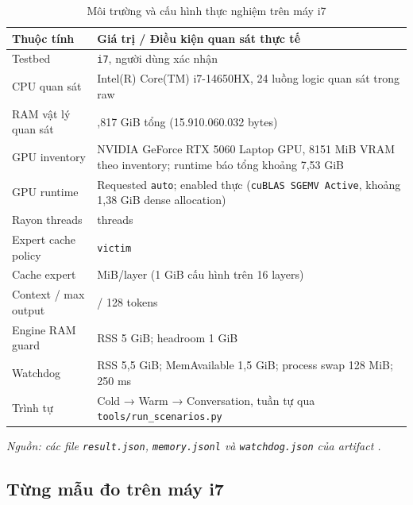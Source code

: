 \begin{table}[htbp]
\centering
\caption{Môi trường và cấu hình thực nghiệm trên máy i7}
\small
\setlength{\tabcolsep}{3pt}
\begin{tabularx}{\textwidth}{>{\RaggedRight\arraybackslash}p{4.5cm} >{\RaggedRight\arraybackslash}X}
\toprule
\textbf{Thuộc tính} & \textbf{Giá trị / Điều kiện quan sát thực tế} \\
\midrule
Testbed & \texttt{i7}, người dùng xác nhận \\
CPU quan sát & Intel(R) Core(TM) i7-14650HX, 24 luồng logic quan sát trong raw \\
RAM vật lý quan sát & 14,817 GiB tổng (15.910.060.032 bytes) \\
GPU inventory & NVIDIA GeForce RTX 5060 Laptop GPU, 8151 MiB VRAM theo inventory; runtime báo tổng khoảng 7,53 GiB \\
GPU runtime & Requested \texttt{auto}; enabled thực (\texttt{cuBLAS SGEMV Active}, khoảng 1,38 GiB dense allocation) \\
Rayon threads & 8 threads \\
Expert cache policy & \texttt{victim} \\
Cache expert & 64 MiB/layer (1 GiB cấu hình trên 16 layers) \\
Context / max output & 512 / 128 tokens \\
Engine RAM guard & RSS 5 GiB; headroom 1 GiB \\
Watchdog & RSS 5,5 GiB; MemAvailable 1,5 GiB; process swap 128 MiB; 250 ms \\
Trình tự & Cold → Warm → Conversation, tuần tự qua \nolinkurl{tools/run_scenarios.py} \\
\bottomrule
\end{tabularx}

\textit{Nguồn: các file \texttt{result.json}, \texttt{memory.jsonl} và \texttt{watchdog.json} của artifact \cite{exp_phase1_i7}.}
\end{table}



\subsection{Từng mẫu đo trên máy i7}

